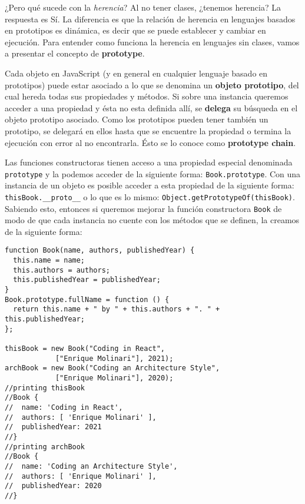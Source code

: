\documentclass[a4paper, oneside, titlepage, 12pt]{book}
\begin{document}
¿Pero qué sucede con la \textit{herencia}? Al no tener clases, ¿tenemos herencia? La respuesta es Sí. La diferencia es que la relación de herencia en lenguajes basados en prototipos es dinámica, es decir que se puede establecer y cambiar en ejecución. Para entender como funciona la herencia en lenguajes sin clases, vamos a presentar el concepto de \textbf{prototype}. 
\newline

Cada objeto en JavaScript (y en general en cualquier lenguaje basado en prototipos) puede estar asociado a lo que se denomina un \textbf{objeto prototipo}, del cual hereda todas sus propiedades y métodos. Si sobre una instancia queremos acceder a una propiedad y ésta no esta definida allí, se \textbf{delega} su búsqueda en el objeto prototipo asociado. Como los prototipos pueden tener también un prototipo, se delegará en ellos hasta que se encuentre la propiedad o termina la ejecución con error al no encontrarla. Ésto se lo conoce como \textbf{prototype chain}.
\newline

Las funciones constructoras tienen acceso a una propiedad especial denominada \texttt{prototype} y la podemos acceder de la siguiente forma: \texttt{Book.prototype}. Con una instancia de un objeto es posible acceder a esta propiedad de la siguiente forma: \texttt{thisBook.__proto__} o lo que es lo mismo: \texttt{Object.getPrototypeOf(thisBook)}. Sabiendo esto, entonces si queremos mejorar la función constructora \texttt{Book} de modo de que cada instancia no cuente con los métodos que se definen, la creamos de la siguiente forma:

\begin{verbatim}
function Book(name, authors, publishedYear) {
  this.name = name;
  this.authors = authors;
  this.publishedYear = publishedYear;
}
Book.prototype.fullName = function () {
  return this.name + " by " + this.authors + ". " + this.publishedYear;
};               
               
thisBook = new Book("Coding in React", 
			["Enrique Molinari"], 2021);
archBook = new Book("Coding an Architecture Style", 
			["Enrique Molinari"], 2020);
//printing thisBook
//Book {
//  name: 'Coding in React',
//  authors: [ 'Enrique Molinari' ],
//  publishedYear: 2021
//}
//printing archBook
//Book {
//  name: 'Coding an Architecture Style',
//  authors: [ 'Enrique Molinari' ],
//  publishedYear: 2020
//}
\end{verbatim}
\end{document}
